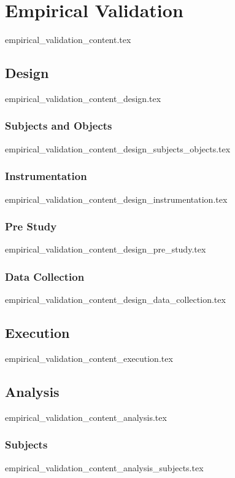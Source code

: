 \chapter{Empirical Validation}
  {empirical_validation_content.tex}

\section{Design}\label{sub:design}
  {empirical_validation_content_design.tex}

\subsection{Subjects and Objects}\label{sub:subjects_objects}
  {empirical_validation_content_design_subjects_objects.tex}

\subsection{Instrumentation}
  {empirical_validation_content_design_instrumentation.tex}

\subsection{Pre Study}\label{sub:pre_study}
  {empirical_validation_content_design_pre_study.tex}

\subsection{Data Collection}
  {empirical_validation_content_design_data_collection.tex}

\section{Execution}\label{sub:execution}
  {empirical_validation_content_execution.tex}

\section{Analysis}\label{sub:analysis}
  {empirical_validation_content_analysis.tex}

\subsection{Subjects}
  {empirical_validation_content_analysis_subjects.tex}

